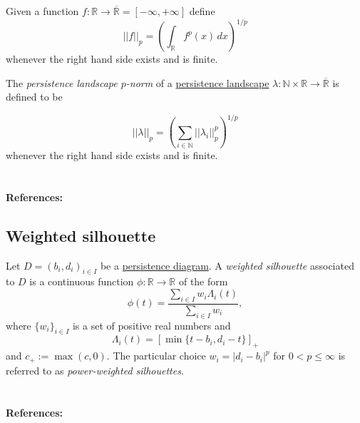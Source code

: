 \documentclass{amsart}
\begin{document}
	Given a function $f : \mathbb R \to \overline{\mathbb R} = [-\infty, +\infty]$ define
	\begin{equation*}
	||f||_p = \left( \int_{\mathbb R} f^p(x)\, dx \right)^{1/p}
	\end{equation*}
	whenever the right hand side exists and is finite.
	
	The \textit{persistence landscape $p$-norm} of a \hyperref[persistence landscape]{persistence landscape} $\lambda : \mathbb N \times \mathbb R \to \overline{\mathbb R}$ is defined to be
	
	\begin{equation*}
	||\lambda||_p = \left( \sum_{i \in \mathbb N} ||\lambda_i||^p_p \right)^{1/p}
	\end{equation*}
	whenever the right hand side exists and is finite.

	\paragraph{\\ References:} \cite{stein2011functional, bubenik2015statistical}
	
	\subsection*{Weighted silhouette} \label{weighted silhouettes}
	
	Let $D = {(b_i, d_i)}_{i \in I}$ be a \hyperref[persistence diagram] {persistence diagram}. A \textit{weighted silhouette} associated to $D$ is a continuous function $\phi : \mathbb R \to \mathbb R$ of the form
	\begin{equation*}
	\phi(t) = \frac{\sum_{i \in I}w_i \Lambda_i(t)}{\sum_{i \in I}w_i},
	\end{equation*}
	where $\{w_i\}_{i \in I}$ is a set of positive real numbers and
	\begin{equation*} \label{equation: lambda for persistence landscapes}
	\Lambda_i(t) = \left[ \min \{t-b_i, d_i-t\}\right]_+
	\end{equation*}
	and $c_+ := \max(c,0)$. The particular choice $w_i = \vert d_i - b_i \vert^p$ for $0 < p \leq \infty$ is referred to as \textit{power-weighted silhouettes}.
	
	\paragraph{\\ References:} \cite{chazal2014stochastic}
	
\end{document}

